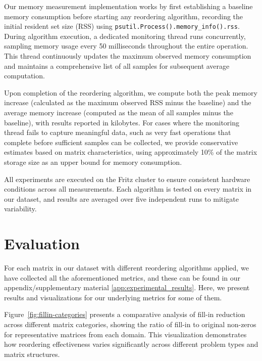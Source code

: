 Our memory measurement implementation works by first establishing a baseline memory consumption before starting any reordering algorithm, recording the initial resident set size (RSS) using \texttt{psutil.Process().memory\_info().rss}. During algorithm execution, a dedicated monitoring thread runs concurrently, sampling memory usage every 50 milliseconds throughout the entire operation. This thread continuously updates the maximum observed memory consumption and maintains a comprehensive list of all samples for subsequent average computation.

Upon completion of the reordering algorithm, we compute both the peak memory increase (calculated as the maximum observed RSS minus the baseline) and the average memory increase (computed as the mean of all samples minus the baseline), with results reported in kilobytes. For cases where the monitoring thread fails to capture meaningful data, such as very fast operations that complete before sufficient samples can be collected, we provide conservative estimates based on matrix characteristics, using approximately 10\% of the matrix storage size as an upper bound for memory consumption.

All experiments are executed on the Fritz cluster to ensure consistent hardware conditions across all measurements. Each algorithm is tested on every matrix in our dataset, and results are averaged over five independent runs to mitigate variability. 

\section{Evaluation}

For each matrix in our dataset with different reordering algorithms applied, we have collected all the aforementioned metrics, and these can be found in our appendix/supplementary material \ref{app:experimental_results}. Here, we present results and visualizations for our underlying metrics for some of them.

Figure~\ref{fig:fillin-categories} presents a comparative analysis of fill-in reduction across different matrix categories, showing the ratio of fill-in to original non-zeros for representative matrices from each domain. This visualization demonstrates how reordering effectiveness varies significantly across different problem types and matrix structures.

